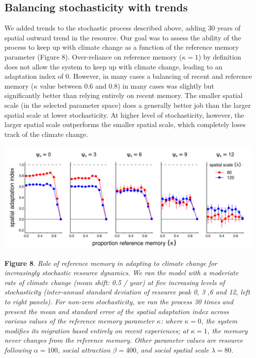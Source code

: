 \documentclass[12pt]{article}
\begin{document}
\hypertarget{balancing-stochasticity-with-trends}{%
\subsection{Balancing stochasticity with
trends}\label{balancing-stochasticity-with-trends}}

We added trends to the stochastic process described above, adding 30
years of spatial outward trend in the resource. Our goal was to assess
the ability of the process to keep up with climate change as a function
of the reference memory parameter (Figure 8). Over-reliance on reference
memory (\(\kappa = 1\)) by definition does not allow the system to keep
up with climate change, leading to an adaptation index of 0. However, in
many cases a balancing of recent and reference memory (\(\kappa\) value
between 0.6 and 0.8) in many cases was slightly but significantly better
than relying entirely on recent memory. The smaller spatial scale (in
the selected parameter space) does a generally better job than the
larger spatial scale at lower stochasticity. At higher level of
stochasticity, however, the larger spatial scale outperforms the smaller
spatial scale, which completely loses track of the climate change.

\includegraphics{figures/TrendStochasticity.png}

\textbf{Figure 8}. \emph{Role of reference memory in adapting to climate
change for increasingly stochastic resource dynamics. We ran the model
with a moderiate rate of climate change (mean shift: 0.5 / year) at five
increasing levels of stochasticity (inter-annual standard deviation of
resource peak 0, 3 ,6 and 12, left to right panels). For non-zero
stochasticity, we ran the process 30 times and present the mean and
standard error of the spatial adaptation index across various values of
the reference memory parameter \(\kappa\): where \(\kappa = 0\), the
system modifies its migration based entirely on recent experiences; at
\(\kappa = 1\), the memory never changes from the reference memory.
Other parameter values are resource following \(\alpha = 100\), social
attraction \(\beta = 400\), and social spatial scale \(\lambda = 80\).}
\end{document}
